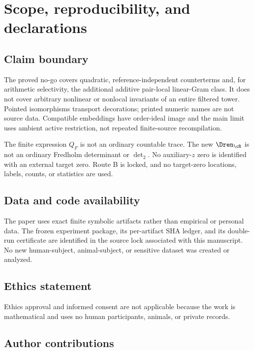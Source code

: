 \section{Scope, reproducibility, and declarations}
\label{app:scope}

\subsection{Claim boundary}

The proved no-go covers quadratic, reference-independent counterterms and,
for arithmetic selectivity, the additional additive pair-local linear-Gram
class.  It does not cover arbitrary nonlinear or nonlocal invariants of an
entire filtered tower.  Pointed isomorphisms transport decorations; printed
numeric names are not source data.  Compatible embeddings have order-ideal
image and the main limit uses ambient active restriction, not repeated
finite-source recompilation.

The finite expression $Q_F$ is not an ordinary countable trace.  The new
$\Dren_{\cR}$ is not an ordinary Fredholm determinant or $\det_2$.
No auxiliary-$z$ zero is identified with an external target zero.  Route B is
locked, and no target-zero locations, labels, counts, or statistics are used.

\subsection{Data and code availability}

The paper uses exact finite symbolic artifacts rather than empirical or
personal data.  The frozen experiment package, its per-artifact SHA ledger,
and its double-run certificate are identified in the source lock associated
with this manuscript.  No new human-subject, animal-subject, or sensitive
dataset was created or analyzed.

\subsection{Ethics statement}

Ethics approval and informed consent are not applicable because the work is
mathematical and uses no human participants, animals, or private records.

\subsection{Author contributions}


